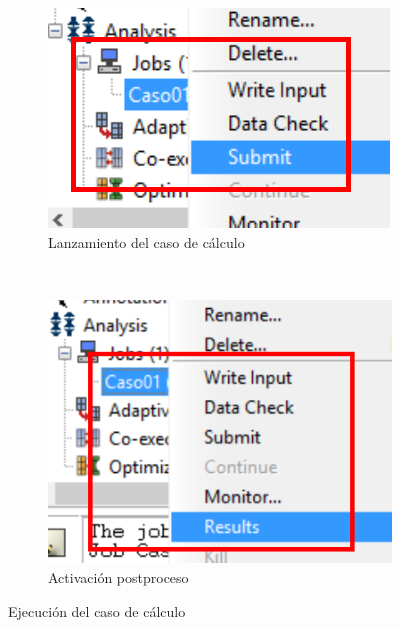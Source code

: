   \begin{figure}[!h]
    \centering
    \begin{subfigure}[!h]{0.42\textwidth}
      \includegraphics[width=\textwidth]{./body/images/job04.pdf}
      \caption{Lanzamiento del caso de cálculo}
      \label{job04}
    \end{subfigure}%
    ~ %
    \begin{subfigure}[!h]{0.42\textwidth}
      \includegraphics[width=\textwidth]{./body/images/job05.pdf}
      \caption{Activación postproceso}
      \label{job05}
    \end{subfigure}%
    \caption{Ejecución del caso de cálculo}
  \end{figure}

